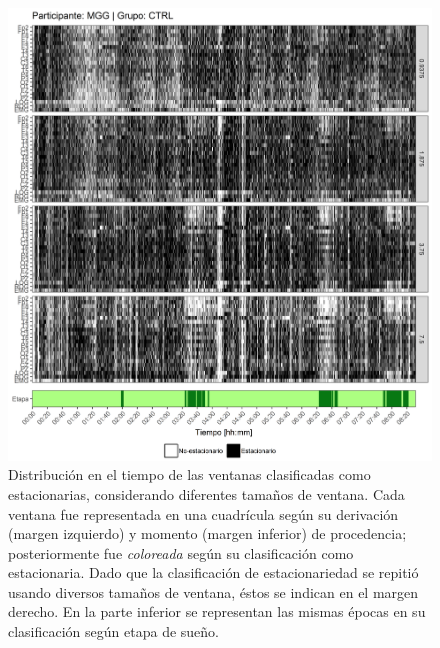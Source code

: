 \documentclass[12pt,letterpaper,draft]{book}
\begin{document}
\begin{figure}
\centering
\includegraphics[width=\linewidth]
{./scripts_graf_res/MGG_patrones_1.png}
\caption[Distribución en el tiempo de las ventanas clasificadas como estacionarias, considerando diferentes tamaños de ventana]{Distribución en el tiempo de las ventanas clasificadas como estacionarias, considerando diferentes tamaños de ventana. 
Cada ventana fue representada en una cuadrícula según su derivación (margen izquierdo) y momento (margen inferior) de procedencia; posteriormente fue \textit{coloreada} según su clasificación como estacionaria.
Dado que la clasificación de estacionariedad se repitió usando diversos tamaños de ventana, éstos se indican en el margen derecho.
En la parte inferior se representan las mismas épocas en su clasificación según etapa de sueño.}
\end{figure}
\end{document}
